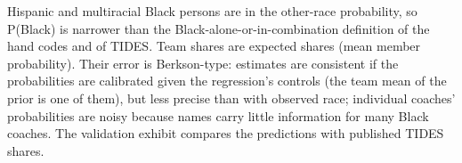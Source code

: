 {Hispanic and multiracial Black persons are in the other-race probability, so P(Black) is narrower than the Black-alone-or-in-combination definition of the hand codes and of TIDES. Team shares are expected shares (mean member probability). Their error is Berkson-type: estimates are consistent if the probabilities are calibrated given the regression's controls (the team mean of the prior is one of them), but less precise than with observed race; individual coaches' probabilities are noisy because names carry little information for many Black coaches. The validation exhibit compares the predictions with published TIDES shares.
\par}

